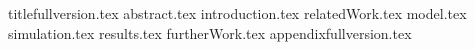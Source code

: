 \documentclass[11pt]{llncs}
\begin{document}
{titlefullversion.tex}
\thispagestyle{plain}
{abstract.tex}
{introduction.tex}
{relatedWork.tex}
{model.tex}
{simulation.tex}
{results.tex}
{furtherWork.tex}
{appendixfullversion.tex}

\end{document}
